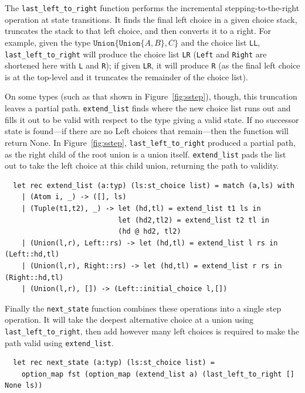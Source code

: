 \documentclass[a4paper,english]{lipics-v2018}
\newcommand{\xt}[1]{\texttt{#1}}
\newcommand{\union}[2]{\xt{Union\{}#1,#2\xt{\}}}
\begin{document}
The \verb|last_left_to_right| function performs the incremental
stepping-to-the-right operation at state transitions. It finds the
final left choice in a given choice stack, truncates the stack to that
left choice, and then converts it to a right. For example, given the
type $\union{\union{A}{B}}{C}$ and the choice list \verb+LL+,
\verb|last_left_to_right| will produce the choice list \verb+LR+
(\verb+Left+ and \verb+Right+ are shortened here with \verb+L+ and
\verb+R+); if given \verb+LR+, it will produce \verb+R+ (as the final
left choice is at the top-level and it truncates the remainder of the
choice list).

On some types (such as that shown in Figure~\ref{fig:sstep}), though, this
truncation leaves a partial path. \verb|extend_list| finds where the new
choice list runs out and fills it out to be valid with respect to the type
giving a valid state. If no successor state is found---if there are no Left
choices that remain---then the function will return None. In Figure~\ref{fig:sstep},
\verb|last_left_to_right| produced a partial path, as the right child of the root
union is a union itself. \verb|extend_list| pads the list out to take the left choice
at this child union, returning the path to validity.
\begin{small}
\begin{verbatim}
  let rec extend_list (a:typ) (ls:st_choice list) = match (a,ls) with
    | (Atom i, _) -> ([], ls)
    | (Tuple(t1,t2), _) -> let (hd,tl) = extend_list t1 ls in
                           let (hd2,tl2) = extend_list t2 tl in
                           (hd @ hd2, tl2)
    | (Union(l,r), Left::rs) -> let (hd,tl) = extend_list l rs in (Left::hd,tl)
    | (Union(l,r), Right::rs) -> let (hd,tl) = extend_list r rs in (Right::hd,tl)
    | (Union(l,r), []) -> (Left::initial_choice l,[])
\end{verbatim}
\end{small}


Finally the \verb|next_state| function combines these operations into
a single step operation. It will take the deepest alternative choice
at a union using \verb|last_left_to_right|, then add however many left
choices is required to make the path valid using \verb|extend_list|.
\begin{small}
\begin{verbatim}
  let rec next_state (a:typ) (ls:st_choice list) =
    option_map fst (option_map (extend_list a) (last_left_to_right [] None ls))
\end{verbatim}
\end{small}
\end{document}
